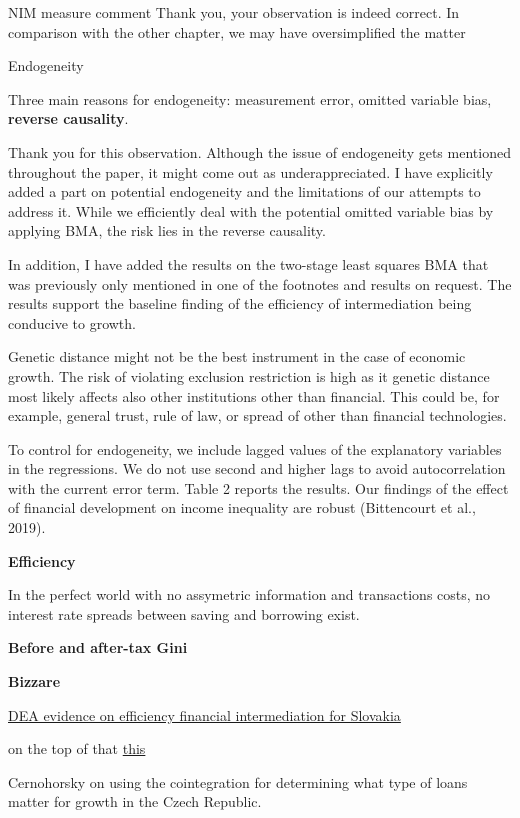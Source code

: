 \documentclass[a4paper,11pt]{article}
\begin{document}
NIM measure comment
Thank you, your observation is indeed correct. In comparison with the other chapter, we may have oversimplified the matter

Endogeneity

Three main reasons for endogeneity: measurement error, omitted variable bias, \textbf{reverse causality}.

Thank you for this observation. Although the issue of endogeneity gets mentioned throughout the paper, it might come out as underappreciated. I have explicitly added a part on potential endogeneity and the limitations of our attempts to address it. While we efficiently deal with the potential omitted variable bias by applying BMA, the risk lies in the reverse causality. 

In addition, I have added the results on the two-stage least squares BMA that was previously only mentioned in one of the footnotes and results on request. The results support the baseline finding of the efficiency of intermediation being conducive to growth.

Genetic distance might not be the best instrument in the case of economic growth. The risk of violating exclusion restriction is high as it genetic distance most likely affects also other institutions other than financial. This could be, for example, general trust, rule of law, or spread of other than financial technologies.

To control for endogeneity, we include lagged values of the explanatory variables in the regressions. We do not use second and higher lags to avoid autocorrelation with the current error term. Table 2 reports the results. Our findings of the effect of financial development on income inequality are robust (Bittencourt et al., 2019).


\textbf{Efficiency}

In the perfect world with no assymetric information and transactions costs, no interest rate spreads between saving and borrowing exist.

\textbf{Before and after-tax Gini}


\textbf{Bizzare}

\href{https://dspace.tul.cz/bitstream/handle/15240/26635/EM_3_2018_10.pdf?sequence=1&isAllowed=y}{DEA evidence on efficiency financial intermediation for Slovakia}

on the top of that \href{https://dspace.tul.cz/bitstream/handle/15240/21377/EM_4_2017_03.pdf?sequence=1&isAllowed=y}{this}

Cernohorsky on using the cointegration for determining what type of loans matter for growth in the Czech Republic.

\printbibliography
\end{document}
